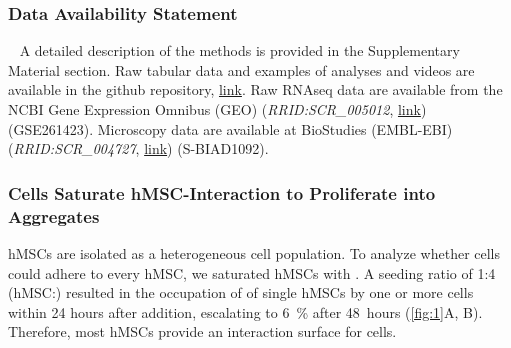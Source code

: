 
\subsubsection*{Data Availability Statement}
\ %
A detailed description of the methods is provided in the Supplementary Material section. Raw
tabular data and examples of analyses and videos are available in the github repository, \href{https://github.com/markur4/Supplemental-INA-6-Subpopulations-and-Aggregation-Detachment-Dynamics}{link}.
Raw RNAseq data are available from the NCBI Gene Expression Omnibus (GEO)
(\textit{RRID:SCR\_005012}, \href{https://www.ncbi.nlm.nih.gov/geo/query/acc.cgi?acc=GSE261423}{link}) (GSE261423). Microscopy data are available at BioStudies
(EMBL-EBI) (\textit{RRID:SCR\_004727}, \href{https://www.ebi.ac.uk/biostudies/bioimages/studies/S-BIAD1092?key=69bafe9c-74ff-492b-9e68-bd42655c4d1b}{link}) (S-BIAD1092).

\newpage







\label{C1:results}



\subsubsection*{\INA Cells Saturate hMSC-Interaction to Proliferate into Aggregates}
hMSCs are isolated as a heterogeneous cell population. To analyze whether \INA
cells could adhere to every hMSC, we saturated hMSCs with \INA. A seeding ratio
of 1:4 (hMSC:\INA) resulted in the occupation of 
of single hMSCs by one or more \INA cells within 24 hours after \INA addition,
escalating to \SI{6}{\percent} after \SI{48}{hours} (\autoref{fig:1}A, B).
Therefore, most hMSCs provide an interaction surface for \INA cells.

